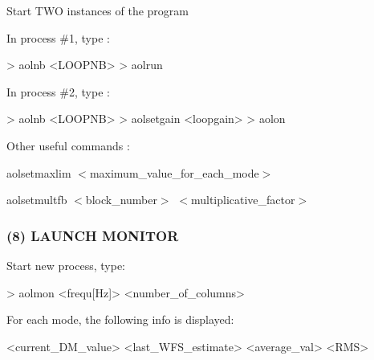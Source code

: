 Start T\+W\+O instances of the program

In process \#1, type \+: \begin{DoxyVerb}> aolnb <LOOPNB>
> aolrun
\end{DoxyVerb}


In process \#2, type \+: \begin{DoxyVerb}> aolnb <LOOPNB>
> aolsetgain <loopgain>
> aolon
\end{DoxyVerb}


Other useful commands \+:
\begin{DoxyItemize}
\item aolsetmaxlim $<$maximum\+\_\+value\+\_\+for\+\_\+each\+\_\+mode$>$
\item aolsetmultfb $<$block\+\_\+number$>$ $<$multiplicative\+\_\+factor$>$
\end{DoxyItemize}

\subsubsection*{(8) L\+A\+U\+N\+C\+H M\+O\+N\+I\+T\+O\+R}

Start new process, type\+: \begin{DoxyVerb}> aolmon <frequ[Hz]> <number_of_columns>
\end{DoxyVerb}


For each mode, the following info is displayed\+: \begin{DoxyVerb}   <current_DM_value> <last_WFS_estimate> <average_val> <RMS> 
\end{DoxyVerb}
 